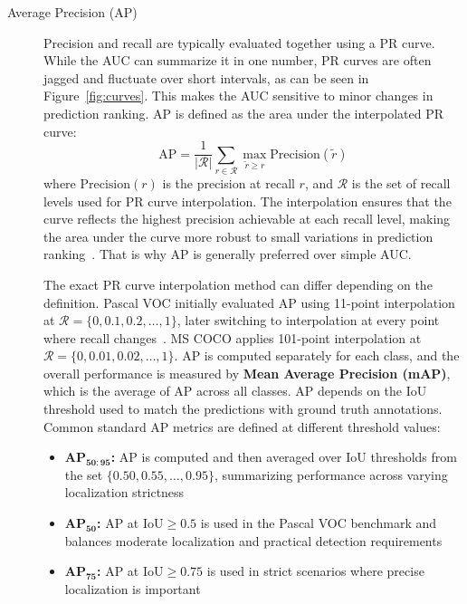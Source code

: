 \begin{description}
    \item[Average Precision (AP)] Precision and recall are typically evaluated together using a PR curve. While the AUC can summarize it in one number, PR curves are often jagged and fluctuate over short intervals, as can be seen in Figure~\ref{fig:curves}. This makes the AUC sensitive to minor changes in prediction ranking. AP is defined as the area under the interpolated PR curve:
    \begin{equation}\label{eq:ap}
        \mathrm{AP} = \frac{1}{|\mathcal{R}|} \sum_{r \in \mathcal{R}} \max_{\tilde{r} \geq r} \text{Precision}(\tilde{r})
    \end{equation}
    where $\text{Precision}(r)$ is the precision at recall $r$, and $\mathcal{R}$ is the set of recall levels used for PR curve interpolation. The interpolation ensures that the curve reflects the highest precision achievable at each recall level, making the area under the curve more robust to small variations in prediction ranking~\cite{Everingham2010}. That is why AP is generally preferred over simple AUC.
    
    The exact PR curve interpolation method can differ depending on the definition. Pascal VOC initially evaluated AP using 11-point interpolation at $\mathcal{R} = \{0, 0.1, 0.2, \dotsc, 1\}$, later switching to interpolation at every point where recall changes~\cite{Everingham2015}. MS COCO applies 101-point interpolation at $\mathcal{R} = \{0, 0.01, 0.02, \dotsc, 1\}$. AP is computed separately for each class, and the overall performance is measured by \textbf{Mean Average Precision (mAP)}, which is the average of AP across all classes. AP depends on the IoU threshold used to match the predictions with ground truth annotations. Common standard AP metrics are defined at different threshold values:
    \begin{itemize}
        \item $\mathbf{AP_{50:95}}$\textbf{:} AP is computed and then averaged over IoU thresholds from the set $\{0.50, 0.55, \dotsc, 0.95\}$, summarizing performance across varying localization strictness
        \item $\mathbf{\mathbf{AP_{50}}}$\textbf{:} AP at $\text{IoU} \geq 0.5$ is used in the Pascal VOC benchmark and balances moderate localization and practical detection requirements
        \item $\mathbf{AP_{75}}$\textbf{:} AP at $\text{IoU} \geq 0.75$ is used in strict scenarios where precise localization is important~\cite{Terven2025, Liu2020, Everingham2010}
    \end{itemize}
\end{description}


